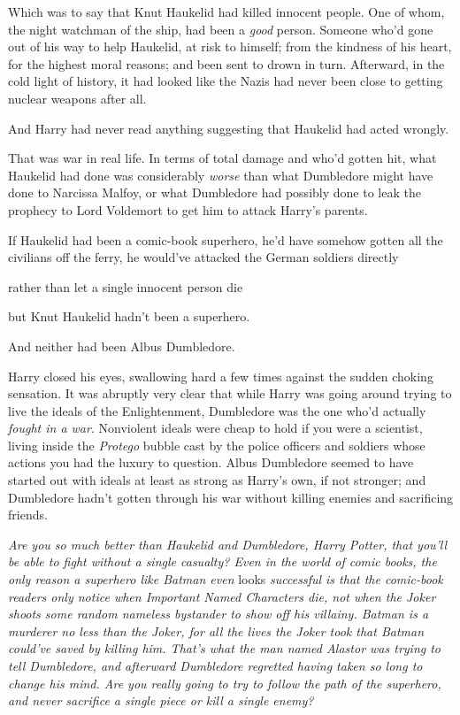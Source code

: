 Which was to say that Knut Haukelid had killed innocent people. One of whom,
the night watchman of the ship, had been a \emph{good} person. Someone who'd
gone out of his way to help Haukelid, at risk to himself; from the kindness of
his heart, for the highest moral reasons; and been sent to drown in turn.
Afterward, in the cold light of history, it had looked like the Nazis had never
been close to getting nuclear weapons after all.

And Harry had never read anything suggesting that Haukelid had acted wrongly.

That was war in real life. In terms of total damage and who'd gotten hit, what
Haukelid had done was considerably \emph{worse} than what Dumbledore might have
done to Narcissa Malfoy, or what Dumbledore had possibly done to leak the
prophecy to Lord Voldemort to get him to attack Harry's parents.

If Haukelid had been a comic-book superhero, he'd have somehow gotten all the
civilians off the ferry, he would've attacked the German soldiers
directly{\el}

{\el} rather than let a single innocent person die{\el}

{\el} but Knut Haukelid hadn't been a superhero.

And neither had been Albus Dumbledore.

Harry closed his eyes, swallowing hard a few times against the sudden choking
sensation. It was abruptly very clear that while Harry was going around trying
to live the ideals of the Enlightenment, Dumbledore was the one who'd actually
\emph{fought in a war}. Nonviolent ideals were cheap to hold if you were a
scientist, living inside the \emph{Protego} bubble cast by the police officers
and soldiers whose actions you had the luxury to question. Albus Dumbledore
seemed to have started out with ideals at least as strong as Harry's own, if
not stronger; and Dumbledore hadn't gotten through his war without killing
enemies and sacrificing friends.

\emph{Are you so much better than Haukelid and Dumbledore, Harry Potter, that
you'll be able to fight without a single casualty? Even in the world of comic
books, the only reason a superhero like Batman even} looks \emph{successful is
that the comic-book readers only notice when Important Named Characters die,
not when the Joker shoots some random nameless bystander to show off his
villainy. Batman is a murderer no less than the Joker, for all the lives the
Joker took that Batman could've saved by killing him. That's what the man named
Alastor was trying to tell Dumbledore, and afterward Dumbledore regretted
having taken so long to change his mind. Are you really going to try to follow
the path of the superhero, and never sacrifice a single piece or kill a single
enemy?}

